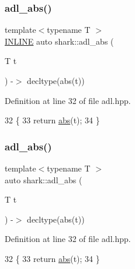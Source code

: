\subsubsection{\texorpdfstring{adl\+\_\+abs()}{adl\_abs()}\hspace{0.1cm}{\footnotesize\ttfamily [1/2]}}
{\footnotesize\ttfamily template$<$typename T $>$ \\
\hyperlink{common_8hpp_a2eb6f9e0395b47b8d5e3eeae4fe0c116}{I\+N\+L\+I\+NE} auto shark\+::adl\+\_\+abs (\begin{DoxyParamCaption}\item[{T}]{t }\end{DoxyParamCaption}) -\/$>$  decltype(abs(t))\hspace{0.3cm}{\ttfamily [inline]}}



Definition at line 32 of file adl.\+hpp.


\begin{DoxyCode}
32                                                  \{
33         \textcolor{keywordflow}{return} \hyperlink{namespaceshark_1_1ndim_a6ec5334c10df1824526954ad5a205531}{abs}(t);
34     \}
\end{DoxyCode}
\hypertarget{namespaceshark_abc9eeb27045e8177d53cd2829813cdb7}{}\label{namespaceshark_abc9eeb27045e8177d53cd2829813cdb7} 
\subsubsection{\texorpdfstring{adl\+\_\+abs()}{adl\_abs()}\hspace{0.1cm}{\footnotesize\ttfamily [2/2]}}
{\footnotesize\ttfamily template$<$typename T $>$ \\
auto shark\+::adl\+\_\+abs (\begin{DoxyParamCaption}\item[{T}]{t }\end{DoxyParamCaption}) -\/$>$ decltype(abs(t)) \hspace{0.3cm}{\ttfamily [inline]}}



Definition at line 32 of file adl.\+hpp.


\begin{DoxyCode}
32                                                  \{
33         \textcolor{keywordflow}{return} \hyperlink{namespaceshark_1_1ndim_a6ec5334c10df1824526954ad5a205531}{abs}(t);
34     \}
\end{DoxyCode}
\hypertarget{namespaceshark_ae60244cfc7c72df7cbd33ab9fb90ff7e}{}\label{namespaceshark_ae60244cfc7c72df7cbd33ab9fb90ff7e} 
